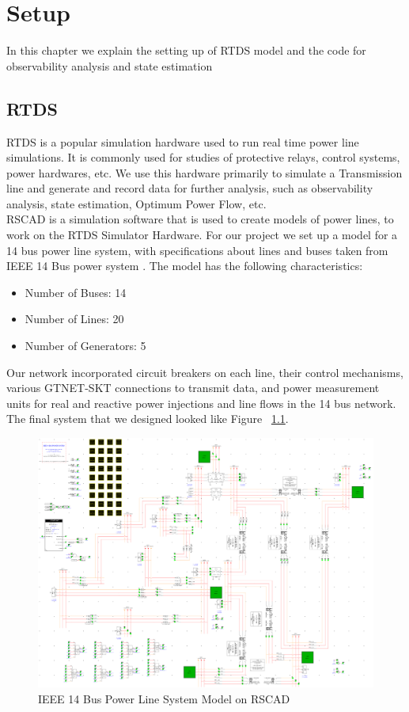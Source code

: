 \chapter{Setup}
In this chapter we explain the setting up of RTDS model and the code for observability analysis and state estimation


\section{RTDS}
RTDS \cite{rtds} is a popular simulation hardware used to run real time power line simulations. It is commonly  used for studies of protective relays, control systems, power hardwares, etc. We use this hardware primarily to simulate a Transmission line and generate and record data for further analysis, such as observability analysis, state estimation, Optimum Power Flow, etc.\\
RSCAD is a simulation software that is used to create models of power lines, to work on the RTDS Simulator Hardware. For our project we set up a model for a 14 bus power line system, with specifications about lines and buses taken from IEEE 14 Bus power system \cite{IEEE14bus}. The model has the following characteristics:
\begin{itemize}
\item Number of Buses: 14
\item Number of Lines: 20
\item Number of Generators: 5
\end {itemize}
Our network incorporated circuit breakers on each line, their control mechanisms, various GTNET-SKT connections to transmit data, and power measurement units for real and reactive power injections and line flows in the 14 bus network. The final system that we designed looked like Figure ~\ref{fig:ckt}.\\
\begin{figure}[h]
\includegraphics[width=\textwidth]{Figures/ckt.png}
\caption{IEEE 14 Bus Power Line System Model on RSCAD}\label{fig:ckt}
\end{figure}

